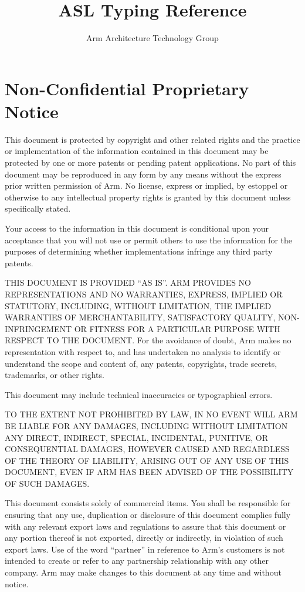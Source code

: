 \documentclass{book}
\author{Arm Architecture Technology Group}
\title{ASL Typing Reference}
\begin{document}
\maketitle

\tableofcontents{}

\chapter{Non-Confidential Proprietary Notice}
 
This document is protected by copyright and other related rights and the
practice or implementation of the information contained in this document may be
protected by one or more patents or pending patent applications. No part of
this document may be reproduced in any form by any means without the express
prior written permission of Arm. No license, express or implied, by estoppel or
otherwise to any intellectual property rights is granted by this document
unless specifically stated.
               
Your access to the information in this document is conditional upon your
acceptance that you will not use or permit others to use the information for
the purposes of determining whether implementations infringe any third party
patents.
 
THIS DOCUMENT IS PROVIDED “AS IS”. ARM PROVIDES NO REPRESENTATIONS AND NO
WARRANTIES, EXPRESS, IMPLIED OR STATUTORY, INCLUDING, WITHOUT LIMITATION, THE
IMPLIED WARRANTIES OF MERCHANTABILITY, SATISFACTORY QUALITY, NON-INFRINGEMENT
OR FITNESS FOR A PARTICULAR PURPOSE WITH RESPECT TO THE DOCUMENT. For the
avoidance of doubt, Arm makes no representation with respect to, and has
undertaken no analysis to identify or understand the scope and content of, any
patents, copyrights, trade secrets, trademarks, or other rights. 
 
This document may include technical inaccuracies or typographical errors.
 
TO THE EXTENT NOT PROHIBITED BY LAW, IN NO EVENT WILL ARM BE LIABLE FOR ANY
DAMAGES, INCLUDING WITHOUT LIMITATION ANY DIRECT, INDIRECT, SPECIAL,
INCIDENTAL, PUNITIVE, OR CONSEQUENTIAL DAMAGES, HOWEVER CAUSED AND REGARDLESS
OF THE THEORY OF LIABILITY, ARISING OUT OF ANY USE OF THIS DOCUMENT, EVEN IF
ARM HAS BEEN ADVISED OF THE POSSIBILITY OF SUCH DAMAGES.
 
This document consists solely of commercial items. You shall be responsible for
ensuring that any use, duplication or disclosure of this document complies
fully with any relevant export laws and regulations to assure that this
document or any portion thereof is not exported, directly or indirectly, in
violation of such export laws. Use of the word “partner” in reference to Arm’s
customers is not intended to create or refer to any partnership relationship
with any other company. Arm may make changes to this document at any time and
without notice.
 
\end{document}
